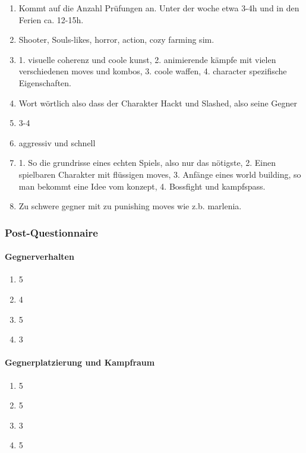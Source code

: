 \documentclass[../Main.tex]{subfiles}
\begin{document}
\begin{enumerate}[label=\textbf{P\arabic*}, leftmargin=1.5cm, itemsep=0.8em]
    \item Kommt auf die Anzahl Prüfungen an. Unter der woche etwa 3-4h und in den Ferien ca. 12-15h.

    \item Shooter, Souls-likes, horror, action, cozy farming sim.

    \item 1. visuelle coherenz und coole kunst, 2. animierende kämpfe mit vielen verschiedenen moves und kombos, 3. coole waffen, 4. character spezifische Eigenschaften.

    \item Wort wörtlich also dass der Charakter Hackt und Slashed, also seine Gegner

    \item 3-4

    \item aggressiv und schnell

    \item 1. So die grundrisse eines echten Spiels, also nur das nötigste, 2. Einen spielbaren Charakter mit flüssigen moves, 3. Anfänge eines world building, so man bekommt eine Idee vom konzept, 4. Bossfight und kampfspass.

    \item Zu schwere gegner mit zu punishing moves wie z.b. marlenia.
\end{enumerate}

\subsubsection{Post-Questionnaire}

\paragraph{Gegnerverhalten}
\begin{enumerate}[label=\textbf{Q\arabic*}, leftmargin=1.5cm, itemsep=0.8em]
    \item 5
    \item 4
    \item 5
    \item 3
\end{enumerate}

\paragraph{Gegnerplatzierung und Kampfraum}
\begin{enumerate}[label=\textbf{Q\arabic*}, leftmargin=1.5cm, itemsep=0.8em, resume]
    \item 5
    \item 5
    \item 3
    \item 5
\end{enumerate}
\end{document}
